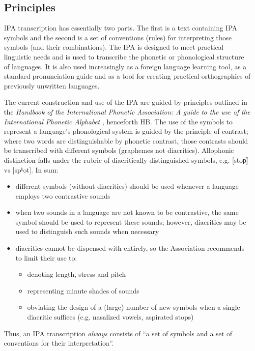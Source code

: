 \subsection{Principles}

IPA transcription has essentially two parts. The first is a text containing IPA 
symbols and the second is a set of conventions (rules) for interpreting those 
symbols (and their combinations). The IPA is designed to meet practical linguistic 
needs and is used to transcribe the phonetic or phonological structure of languages. 
It is also used increasingly as a foreign language learning tool, as a standard 
pronunciation guide and as a tool for creating practical orthographies of 
previously unwritten languages. 

The current construction and use of the IPA are guided by principles outlined 
in the \textit{Handbook of the International Phonetic Association: A guide 
to the use of the International Phonetic Alphabet} \citep[159]{IPA1999}, henceforth 
HB. The use of the symbols to represent a language's phonological system is guided 
by the principle of contrast; where two words are distinguishable by phonetic contrast, 
those contrasts should be transcribed with different symbols (graphemes not diacritics). 
Allophonic distinction falls under the rubric of diacritically-distinguished symbols, 
e.g. [stop̚] vs [spʰot]. In sum:

\begin{itemize}
	\item different symbols (without diacritics) should be used whenever a language employs two contrastive sounds
	\item when two sounds in a language are not known to be contrastive, the same symbol should be used to represent these sounds; however, diacritics may be used to distinguish such sounds when necessary
	\item diacritics cannot be dispensed with entirely, so the Association recommends to limit their use to:
	\begin{itemize}
		\item denoting length, stress and pitch
		\item representing minute shades of sounds
		\item obviating the design of a (large) number of new symbols when a single diacritic suffices (e.g. nasalized vowels, aspirated stops)
	\end{itemize}
\end{itemize}	

\noindent Thus, an IPA transcription \textit{always} consists of ``a set of 
symbols and a set of conventions for their interpretation''. 

